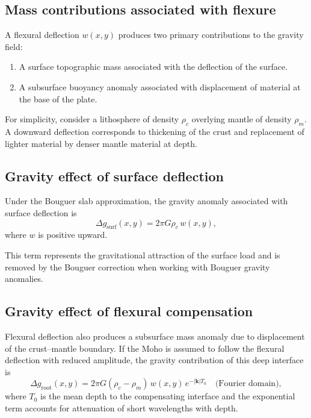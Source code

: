 \subsection{Mass contributions associated with flexure}

A flexural deflection \(w(x,y)\) produces two primary contributions to the gravity field:

\begin{enumerate}
    \item A surface topographic mass associated with the deflection of the surface.
    \item A subsurface buoyancy anomaly associated with displacement of material at the base of the plate.
\end{enumerate}

For simplicity, consider a lithosphere of density \(\rho_c\) overlying mantle of density \(\rho_m\). A downward deflection corresponds to thickening of the crust and replacement of lighter material by denser mantle material at depth.

\subsection{Gravity effect of surface deflection}

Under the Bouguer slab approximation, the gravity anomaly associated with surface deflection is
\begin{equation}
\Delta g_{\mathrm{surf}}(x,y) = 2\pi G \rho_c \, w(x,y),
\end{equation}
where \(w\) is positive upward.

This term represents the gravitational attraction of the surface load and is removed by the Bouguer correction when working with Bouguer gravity anomalies.

\subsection{Gravity effect of flexural compensation}

Flexural deflection also produces a subsurface mass anomaly due to displacement of the crust--mantle boundary. If the Moho is assumed to follow the flexural deflection with reduced amplitude, the gravity contribution of this deep interface is
\begin{equation}
\Delta g_{\mathrm{root}}(x,y)
=
2\pi G (\rho_c - \rho_m)\, w(x,y)\, e^{-|\mathbf{k}|T_0}
\quad \text{(Fourier domain)} ,
\end{equation}
where \(T_0\) is the mean depth to the compensating interface and the exponential term accounts for attenuation of short wavelengths with depth.

